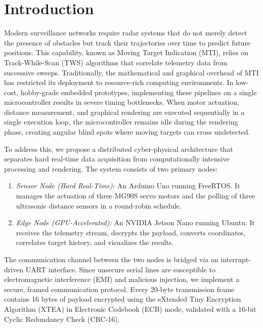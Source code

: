 \documentclass[conference]{IEEEtran}
\begin{document}
\section{Introduction}
Modern surveillance networks require radar systems that do not merely detect the presence of obstacles but track their trajectories over time to predict future positions. This capability, known as Moving Target Indication (MTI), relies on Track-While-Scan (TWS) algorithms that correlate telemetry data from successive sweeps. Traditionally, the mathematical and graphical overhead of MTI has restricted its deployment to resource-rich computing environments. In low-cost, hobby-grade embedded prototypes, implementing these pipelines on a single microcontroller results in severe timing bottlenecks. When motor actuation, distance measurement, and graphical rendering are executed sequentially in a single execution loop, the microcontroller remains idle during the rendering phase, creating angular blind spots where moving targets can cross undetected.

To address this, we propose a distributed cyber-physical architecture that separates hard real-time data acquisition from computationally intensive processing and rendering. The system consists of two primary nodes:
\begin{enumerate}
    \item \textit{Sensor Node (Hard Real-Time):} An Arduino Uno running FreeRTOS. It manages the actuation of three MG90S servo motors and the polling of three ultrasonic distance sensors in a round-robin schedule.
    \item \textit{Edge Node (GPU-Accelerated):} An NVIDIA Jetson Nano running Ubuntu. It receives the telemetry stream, decrypts the payload, converts coordinates, correlates target history, and visualizes the results.
\end{enumerate}

The communication channel between the two nodes is bridged via an interrupt-driven UART interface. Since unsecure serial lines are susceptible to electromagnetic interference (EMI) and malicious injection, we implement a secure, framed communication protocol. Every 20-byte transmission frame contains 16 bytes of payload encrypted using the eXtended Tiny Encryption Algorithm (XTEA) in Electronic Codebook (ECB) mode, validated with a 16-bit Cyclic Redundancy Check (CRC-16).
\end{document}
